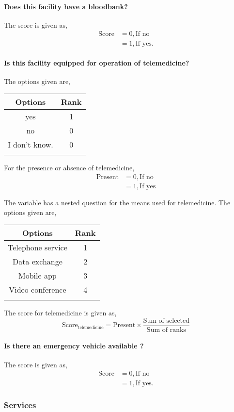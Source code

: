 \documentclass[oneside]{article}
\newcommand{\tsub}[2]{\text{#1}_{\text{#2}}}
\newcommand{\dsub}[2]{\dfrac{\text{#1}}{\text{#2}}}
\newenvironment{ttable}
{
\begin{center}
\begin{tabular}{c|c}
\hline
}
{
\\ \hline
\end{tabular}
\end{center}
}
\begin{document}
\paragraph{ Does this facility have a bloodbank?}

The score is given as,
\begin{align*}
\tsub{Score}{} &= 0, \text{If no} \\
        &= 1, \text{If yes}.
\end{align*}
\paragraph{ Is this facility equipped for operation of telemedicine?}
The options given are,
\begin{ttable}
Options & Rank \\ \hline
yes & 1 \\
no & 0 \\
I don't know. & 0 \\
\hline
\end{ttable}
For the presence or absence of telemedicine,
\begin{align*}
	\text{Present} &= 0, \text{If no} \\
	&= 1, \text{If yes}
\end{align*}

The variable has a nested question for the means used for telemedicine. The options given are,
\begin{ttable}
	Options & Rank \\ \hline
	Telephone service & 1 \\
	Data exchange & 2 \\
	Mobile app & 3 \\
	Video conference & 4 \\ \hline
\end{ttable}
The score for telemedicine is given as,
\[
	\tsub{Score}{telemedicine} = \text{Present} \times \dsub{Sum of selected}{Sum of ranks}
\]	
\paragraph{ Is there an emergency vehicle available ?}

The score is given as,
\begin{align*}
\tsub{Score}{} &= 0, \text{If no} \\
        &= 1, \text{If yes}.
\end{align*}
\subsubsection{Services}
\end{document}
